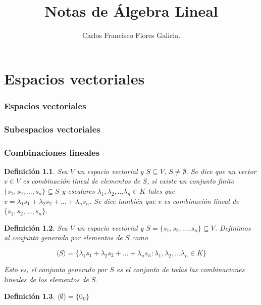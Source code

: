 \documentclass{book}
\title{Notas de Álgebra Lineal}
\author{Carlos Francisco Flores Galicia.}
\date{}
\newtheorem{definition}{Definición}
\begin{document}
\maketitle

\chapter{Espacios vectoriales}
\subsection{Espacios vectoriales}
\subsection{Subespacios vectoriales}
\subsection{Combinaciones lineales}

\begin{definition}
Sea $V$ un espacio vectorial y $S \subseteq V$, $S \neq \emptyset$. Se dice que un vector $v \in V$ es combinación lineal de elementos de $S$, si existe un conjunto finito $\{s_1,s_2,...,s_n\}\subseteq S$ y escalares $\lambda_1,\lambda_2,...\lambda_n \in K$ tales que $v=\lambda_1 s_1+\lambda_2 s_2+...+\lambda_n s_n$. Se dice también que $v$ es combinación lineal de $\{s_1,s_2,...,s_n\}$.
\end{definition}

\begin{definition}
Sea $V$ un espacio vectorial y $S=\{ s_1,s_2,...,s_n \} \subseteq V$. Definimos al conjunto generado por elementos de $S$ como

\begin{equation}
\langle S \rangle = \{\lambda_1 s_1+\lambda_2 s_2+...+\lambda_n s_n : \lambda_1,\lambda_2,...\lambda_n \in K \}
\end{equation}

Esto es, el conjunto generado por $S$ es el conjunto de todas las combinaciones lineales de los elementos de $S$.
\end{definition}

\begin{definition}
$\langle \emptyset \rangle=\{0_V\}$
\end{definition}
\end{document}

